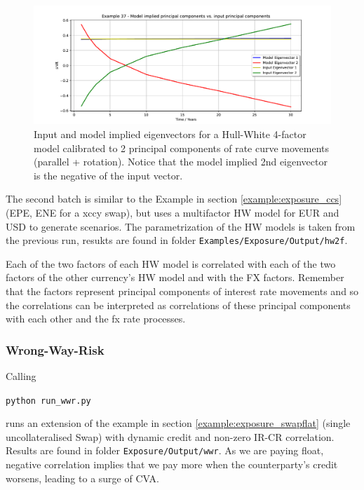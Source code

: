 \begin{figure}[h!]
\begin{center}
\includegraphics[scale=0.50]{examples/mpl_eigenvectors_ex37.pdf}
\end{center}
\caption{Input and model implied eigenvectors for a Hull-White 4-factor model calibrated to 2 principal components of
  rate curve movements (parallel + rotation). Notice that the model implied 2nd eigenvector is the negative of the input
  vector.}
\label{fig:ex37}
\end{figure}

The second batch is similar to the Example in section \ref{example:exposure_ccs} (EPE, ENE for a xccy swap), but uses a
multifactor HW model for EUR and USD to generate scenarios. The parametrization of the HW models is taken from the previous run,
resukts are found in folder {\tt Examples/Exposure/Output/hw2f}.

Each of the two factors of each HW model is correlated with each of the two factors of the other currency's HW model and
with the FX factors. Remember that the factors represent principal components of interest rate movements and so the
correlations can be interpreted as correlations of these principal components with each other and the fx rate processes.

\subsubsection{Wrong-Way-Risk}\label{example:exposure_wwr}

Calling

\medskip
\centerline{\tt python run\_wwr.py } 
\medskip

runs an extension of the example in section \ref{example:exposure_swapflat} (single uncollateralised Swap) with dynamic
credit and non-zero IR-CR correlation. Results are found in folder {\tt Exposure/Output/wwr}.
As we are paying float, negative correlation implies that we pay more when the counterparty's credit worsens, leading to
a surge of CVA.


